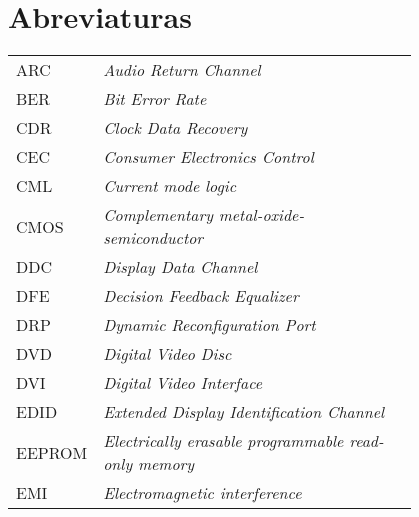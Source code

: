 \chapter*{Abreviaturas}

\begin{flushleft}
\begin{longtable}{l p{0.8\linewidth}}
ARC       & \textit{Audio Return Channel}                                                                         \\
BER       & \textit{Bit Error Rate}                                                                           \\
CDR       & \textit{Clock Data Recovery}                                                                          \\
CEC       & \textit{Consumer Electronics Control}                                                                 \\
CML       & \textit{Current mode logic }                                                                          \\
CMOS      & \textit{Complementary metal-oxide-semiconductor }                                                     \\
DDC       & \textit{Display Data Channel  }                                                                       \\
DFE       & \textit{Decision Feedback Equalizer}                                                                  \\
DRP       & \textit{Dynamic Reconfiguration Port}                                                                 \\
DVD       & \textit{Digital Video Disc}                                                                           \\
DVI       & \textit{Digital Video Interface}                                                                      \\
EDID      & \textit{Extended Display Identification Channel}                                                      \\
EEPROM    & \textit{Electrically erasable programmable read-only memory}                                          \\
EMI       & \textit{Electromagnetic interference }                                                                \\

\end{longtable}
\end{flushleft}
